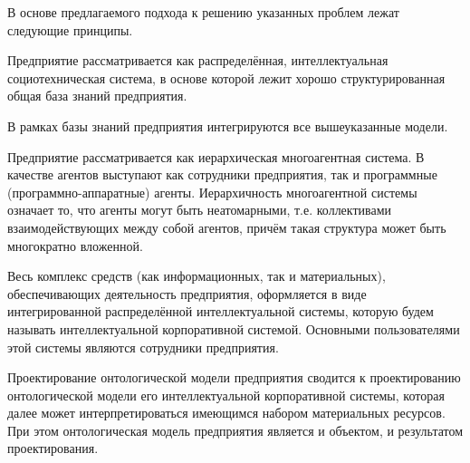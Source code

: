 В основе предлагаемого подхода к решению указанных проблем лежат следующие принципы.
\begin{textitemize}
    \item Предприятие рассматривается как распределённая, интеллектуальная социотехническая система, в основе которой лежит хорошо структурированная общая база знаний предприятия.
    \item В рамках базы знаний предприятия интегрируются все вышеуказанные модели.
    \item Предприятие рассматривается как иерархическая многоагентная система. В качестве агентов выступают как сотрудники предприятия, так и программные (программно-аппаратные) агенты. Иерархичность многоагентной системы означает то, что агенты могут быть неатомарными, т.е. коллективами взаимодействующих между собой агентов, причём такая структура может быть многократно вложенной.
    \item Весь комплекс средств (как информационных, так и материальных), обеспечивающих деятельность предприятия, оформляется в виде интегрированной распределённой интеллектуальной системы, которую будем называть интеллектуальной корпоративной системой. Основными пользователями этой системы являются сотрудники предприятия.
    \item Проектирование онтологической модели предприятия сводится к проектированию онтологической модели его интеллектуальной корпоративной системы, которая далее может интерпретироваться имеющимся набором материальных ресурсов. При этом онтологическая модель предприятия является и объектом, и результатом проектирования.
\end{textitemize}

